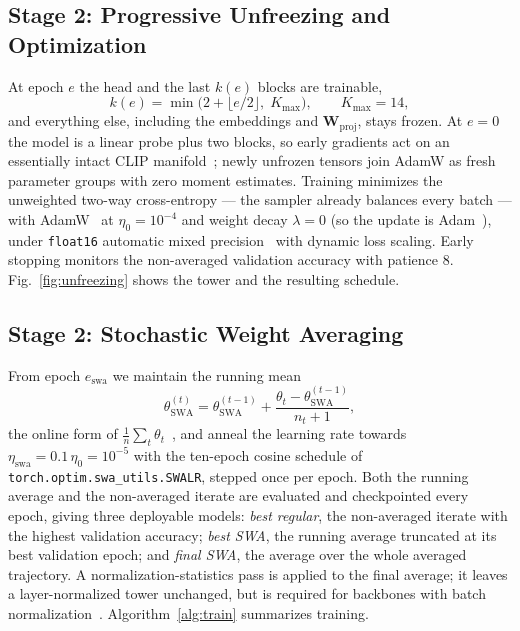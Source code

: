 \documentclass[10pt,journal]{IEEEtran}
\newcommand{\mat}[1]{\mathbf{#1}}
\begin{document}
\subsection{Stage 2: Progressive Unfreezing and Optimization}\label{sec:unfreeze}
At epoch $e$ the head and the last $k(e)$ blocks are trainable,
\begin{equation}
k(e)=\min\big(2+\lfloor e/2\rfloor,\;K_{\max}\big),\qquad K_{\max}=14,
\label{eq:schedule}
\end{equation}
and everything else, including the embeddings and $\mat{W}_{\mathrm{proj}}$,
stays frozen. At $e=0$ the model is a linear probe plus two blocks, so early
gradients act on an essentially intact CLIP manifold~\cite{kumar2022finetuning};
newly unfrozen tensors join AdamW as fresh parameter groups with zero moment
estimates. Training minimizes the unweighted two-way cross-entropy --- the
sampler already balances every batch --- with AdamW~\cite{loshchilov2019adamw}
at $\eta_0=10^{-4}$ and weight decay $\lambda=0$ (so the update is
Adam~\cite{kingma2015adam}), under \texttt{float16} automatic mixed
precision~\cite{micikevicius2018mixed} with dynamic loss scaling. Early
stopping monitors the non-averaged validation accuracy with patience $8$.
Fig.~\ref{fig:unfreezing} shows the tower and the resulting schedule.

\subsection{Stage 2: Stochastic Weight Averaging}\label{sec:swa}
From epoch $e_{\mathrm{swa}}$ we maintain the running mean
\begin{equation}
\theta_{\mathrm{SWA}}^{(t)}=\theta_{\mathrm{SWA}}^{(t-1)}
  +\frac{\theta_t-\theta_{\mathrm{SWA}}^{(t-1)}}{n_t+1},
\label{eq:swa}
\end{equation}
the online form of $\frac{1}{n}\sum_t\theta_t$~\cite{izmailov2018swa}, and anneal
the learning rate towards $\eta_{\mathrm{swa}}=0.1\,\eta_0=10^{-5}$ with the
ten-epoch cosine schedule of \texttt{torch.optim.swa\_utils.SWALR}, stepped once
per epoch. Both the running average and the non-averaged iterate are evaluated
and checkpointed every epoch, giving three deployable models:
\emph{best regular}, the non-averaged iterate with the highest validation
accuracy; \emph{best SWA}, the running average truncated at its best
validation epoch; and \emph{final SWA}, the average over the whole averaged
trajectory. A normalization-statistics pass is applied to the final average;
it leaves a layer-normalized tower unchanged, but is required for backbones
with batch normalization~\cite{ioffe2015batchnorm}. Algorithm~\ref{alg:train}
summarizes training.
\end{document}
